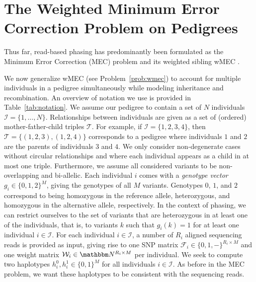 \section{The Weighted Minimum Error Correction Problem on Pedigrees}
Thus far, read-based phasing has predominantly been formulated as the Minimum Error Correction (MEC) problem \citep{Cilibrasi2007} and its weighted sibling wMEC \citep{Greenberg2004}.

We now generalize wMEC (see Problem~\ref{prob:wmec}) to account for multiple individuals in a pedigree simultaneously while modeling inheritance and recombination.
An overview of notation we use is provided in Table~\ref{tab:notation}.
We assume our pedigree to contain a set of $N$ individuals $\mathcal{I}=\{1,\ldots,N\}$.
Relationships between individuals are given as a set of (ordered) mother-father-child triples $\mathcal{T}$.
For example, if $\mathcal{I}=\{1,2,3,4\}$, then $\mathcal{T}=\big\{(1,2,3),(1,2,4)\big\}$ corresponds to a pedigree where individuals $1$ and $2$ are the parents of individuals $3$ and $4$.
We only consider non-degenerate cases without circular relationships and where each individual appears as a child in at most one triple.
Furthermore, we assume all considered variants to be non-overlapping and bi-allelic.
Each individual $i$ comes with a \emph{genotype vector} $g_i\in\{0,1,2\}^M$, giving the genotypes of all $M$ variants.
Genotypes $0$, $1$, and $2$ correspond to being homozygous in the reference allele, heterozygous, and homozygous in the alternative allele, respectively.
In the context of phasing, we can restrict ourselves to the set of variants that are heterozygous in at least one of the individuals, that is, to variants $k$ such that $g_i(k)=1$ for at least one individual $i\in\mathcal{I}$.
For each individual $i\in \mathcal{I}$, a number of $R_i$ aligned sequencing reads is provided as input, giving rise to one SNP matrix $\mathcal{F}_i\in\{0,1,-\}^{R_i\times M}$ and one weight matrix $\mathcal{W}_i\in\N^{R_i\times M}$ per individual.
We seek to compute two haplotypes $h^0_i,h^1_i\in\{0,1\}^M$ for all individuals $i\in\mathcal{I}$.
As before in the MEC problem, we want these haplotypes to be consistent with the sequencing reads.

